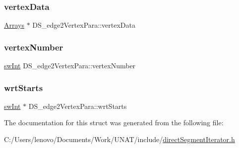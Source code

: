 \subsubsection{\texorpdfstring{vertexData}{vertexData}}
{\footnotesize\ttfamily \mbox{\hyperlink{structArrays}{Arrays}} $\ast$ D\+S\+\_\+edge2\+Vertex\+Para\+::vertex\+Data}

\mbox{\label{structDS__edge2VertexPara_a06077867a2788effa4ae3d294f2ed12d}} 
\subsubsection{\texorpdfstring{vertexNumber}{vertexNumber}}
{\footnotesize\ttfamily \mbox{\hyperlink{include_2swMacro_8h_a113cf5f6b5377cdf3fac6aa4e443e9aa}{sw\+Int}} D\+S\+\_\+edge2\+Vertex\+Para\+::vertex\+Number}

\mbox{\label{structDS__edge2VertexPara_aeacb9f104dc37dbf568c428b7300781b}} 
\subsubsection{\texorpdfstring{wrtStarts}{wrtStarts}}
{\footnotesize\ttfamily \mbox{\hyperlink{include_2swMacro_8h_a113cf5f6b5377cdf3fac6aa4e443e9aa}{sw\+Int}} $\ast$ D\+S\+\_\+edge2\+Vertex\+Para\+::wrt\+Starts}



The documentation for this struct was generated from the following file\+:\begin{DoxyCompactItemize}
\item 
C\+:/\+Users/lenovo/\+Documents/\+Work/\+U\+N\+A\+T/include/\mbox{\hyperlink{include_2directSegmentIterator_8h}{direct\+Segment\+Iterator.\+h}}\end{DoxyCompactItemize}

